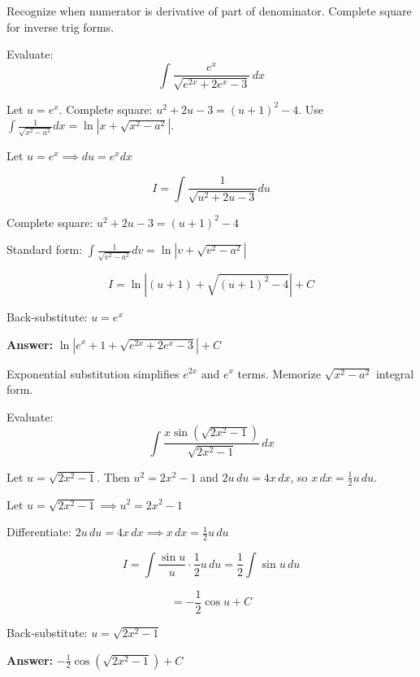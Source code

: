 \begin{takeaways}
Recognize when numerator is derivative of part of denominator. Complete square for inverse trig forms.
\end{takeaways}

\vspace{1cm}

\begin{problem}
Evaluate:
\[
\int \frac{e^x}{\sqrt{e^{2x} + 2e^x - 3}} \, dx
\]
\end{problem}

\begin{hint}
Let $u = e^x$. Complete square: $u^2+2u-3 = (u+1)^2-4$. Use $\int \frac{1}{\sqrt{x^2-a^2}}dx = \ln|x+\sqrt{x^2-a^2}|$.
\end{hint}

\begin{solution}
Let $u = e^x \implies du = e^x dx$

\[
I = \int \frac{1}{\sqrt{u^2+2u-3}} du
\]

Complete square: $u^2+2u-3 = (u+1)^2 - 4$

Standard form: $\int \frac{1}{\sqrt{v^2-a^2}} dv = \ln|v+\sqrt{v^2-a^2}|$

\[
I = \ln|(u+1) + \sqrt{(u+1)^2-4}| + C
\]

Back-substitute: $u = e^x$

\textbf{Answer:} $\boxed{\ln|e^x+1+\sqrt{e^{2x}+2e^x-3}| + C}$
\end{solution}

\begin{takeaways}
Exponential substitution simplifies $e^{2x}$ and $e^x$ terms. Memorize $\sqrt{x^2-a^2}$ integral form.
\end{takeaways}

\vspace{1cm}

\begin{problem}
Evaluate:
\[
\int \frac{x \sin\left(\sqrt{2x^2 - 1}\right)}{\sqrt{2x^2 - 1}} \, dx
\]
\end{problem}

\begin{hint}
Let $u = \sqrt{2x^2-1}$. Then $u^2 = 2x^2-1$ and $2u \, du = 4x \, dx$, so $x \, dx = \frac{1}{2}u \, du$.
\end{hint}

\begin{solution}
Let $u = \sqrt{2x^2-1} \implies u^2 = 2x^2-1$

Differentiate: $2u \, du = 4x \, dx \implies x \, dx = \frac{1}{2}u \, du$

\[
I = \int \frac{\sin u}{u} \cdot \frac{1}{2}u \, du = \frac{1}{2}\int \sin u \, du
\]

\[
= -\frac{1}{2}\cos u + C
\]

Back-substitute: $u = \sqrt{2x^2-1}$

\textbf{Answer:} $\boxed{-\frac{1}{2}\cos\left(\sqrt{2x^2-1}\right) + C}$
\end{solution}

